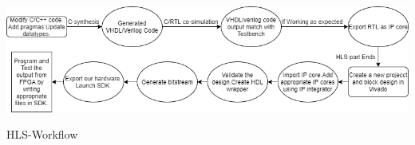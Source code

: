 \documentclass[../../main.tex]{subfiles}
\begin{document}
\begin{itemize}
    \begin{Flowchart}
    \centering
    \includegraphics[width=\textwidth]{Figures/Electrical/HLS_Workflow.png}
    \caption{HLS-Workflow}
    \label{FC:hls_workflow}
\end{Flowchart}

  
\end{itemize}
\end{document}
